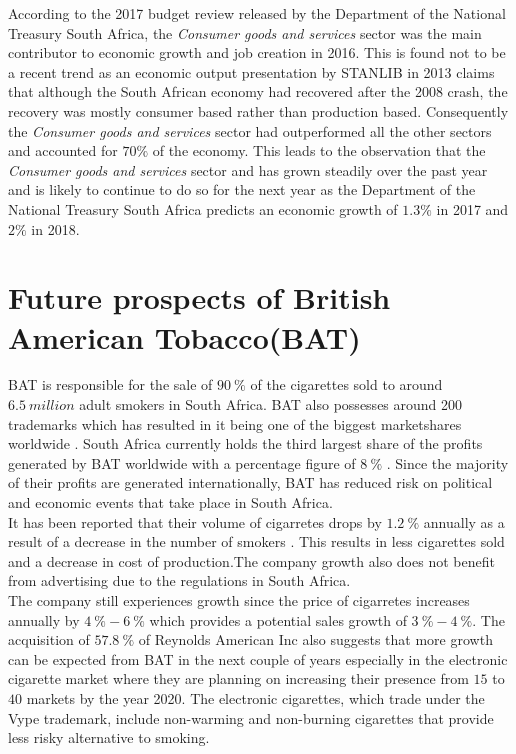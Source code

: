 \documentclass[letterpaper, 10 pt, conference]{ieeeconf}  %
\begin{document}
According to the 2017 budget review \cite{budgetReview} released by the Department of the National Treasury South Africa, the \textit{Consumer goods and services} sector was the main contributor to economic growth and job creation in 2016. This is found not to be a recent trend as an economic output presentation by STANLIB in 2013 \cite{stanlibReport} claims that although the South African economy had recovered after the 2008 crash, the recovery was mostly consumer based rather than production based. Consequently the \textit{Consumer goods and services} sector had outperformed all the other sectors and accounted for $70\%$ of the economy. This leads to the observation that the \textit{Consumer goods and services} sector and has grown steadily over the past year and is likely to continue to do so for the next year as the Department of the National Treasury South Africa predicts an economic growth of $1.3\%$ in 2017 and $2\%$ in 2018. 

\section{Future prospects of British American Tobacco(BAT)}
BAT is responsible for the sale of $90~\%$ of the cigarettes sold to around $6.5~million$ adult smokers in South Africa. BAT also possesses around 200 trademarks which has resulted in it being one of the biggest marketshares worldwide \cite{BAT_hist}. South Africa currently holds the third largest share of the profits generated by BAT worldwide with a percentage figure of $8~\%$ \cite{BAT_hist}. Since the majority of their profits are generated internationally, BAT has reduced risk on political and economic events that take place in South Africa.\\

\noindent It has been reported that their volume of cigarretes drops by $1.2~\%$ annually as a result of a decrease in the number of smokers \cite{BAT_nextgen}. This results in less cigarettes sold and a decrease in cost of production.The company growth also does not benefit from advertising due to the regulations in South Africa.\\

\noindent The company still experiences growth since the price of cigarretes increases annually by $4~\%-6~\%$ \cite{BAT_hist} which provides a potential sales growth of $3~\%-4~\%$. The acquisition of $57.8~\%$ of Reynolds American Inc \cite{BAT_vap} also suggests that more growth can be expected from BAT in the next couple of years especially in the electronic cigarette market where they are planning on increasing their presence from $15$ to $40$ markets by the year 2020. The electronic cigarettes, which trade under the Vype trademark, include non-warming and non-burning cigarettes that provide less risky alternative to smoking. \\
\end{document}
